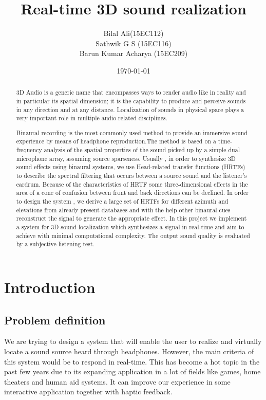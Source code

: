 \documentclass[BTech]{nitkdiss}
\title{Real-time 3D sound realization}
\author{Bilal Ali(15EC112)\\Sathwik G S (15EC116)\\ Barun Kumar Acharya (15EC209)\\}
\date{\today}
\begin{document}
\maketitle
\pagestyle{plain}

\newpage
\begin{abstract}
3D Audio is a generic name that encompasses ways to render audio like in reality and in particular its spatial dimension; it is the capability to produce and perceive sounds in any direction and at any distance. Localization of sounds in physical space plays a very important role in multiple audio-related disciplines.

  Binaural recording is the most commonly used method to provide an immersive sound experience by means of headphone reproduction.The method is based on a time-frequency analysis of the spatial properties of the sound picked up by a simple dual microphone array, assuming source sparseness. 
  Usually  ,  in  order  to synthesize 3D  sound effects  using  binaural  
systems,  we  use  Head-related    transfer    functions    (HRTFs)    to  describe    the    spectral  
filtering    that  occurs  between    a    source  sound  and  the  listener’s  eardrum.  Because  of  the  
characteristics  of  HRTF  some  three-dimensional  effects  in  the  area  of  a  cone  of  confusion  
between front and back directions can be declined. In order to design the system , we derive a large 
set  of  HRTFs  for  different  azimuth  and  elevations  from already present databases and with the help other binaural cues reconstruct the signal to generate the appropriate effect. 
In  this  project  we implement a system for 3D  sound  localization which synthesizes a signal in real-time and aim to achieve with minimal computational complexity. The output sound  quality  is  
evaluated by a subjective listening test. 
\end{abstract}
\tableofcontents

\chapter{Introduction}
\section{ Problem definition } 
We are trying to design a system that will enable the user to realize and virtually locate a sound source heard through headphones. However, the main criteria of this system would be to respond in real-time.
This has become a hot topic in the past few years due to its expanding application in a lot of fields like games, home theaters and human aid systems.  It can improve our experience in some interactive application together with haptic feedback.  
\end{document}
